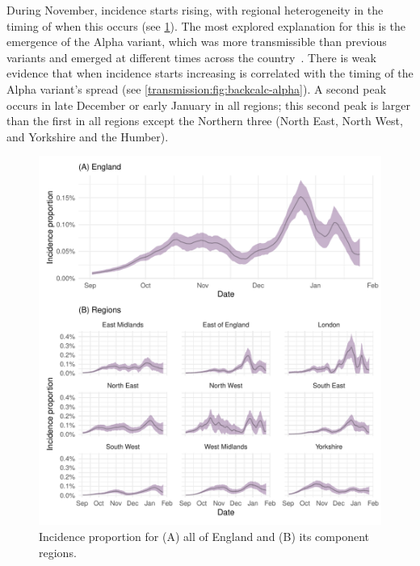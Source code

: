 \documentclass[thesis.tex]{subfiles}
\begin{document}
During November, incidence starts rising, with regional heterogeneity in the timing of when this occurs (see \cref{transmission:fig:backcalc-regions}).
The most explored explanation for this is the emergence of the Alpha variant, which was more transmissible than previous variants and emerged at different times across the country~\autocite{walkerTracking,daviesEstimated,lythgoeLineage}.
There is weak evidence that when incidence starts increasing is correlated with the timing of the Alpha variant's spread (see \cref{transmission:fig:backcalc-alpha}).
A second peak occurs in late December or early January in all regions; this second peak is larger than the first in all regions except the Northern three (North East, North West, and Yorkshire and the Humber).
\begin{figure}
    \includegraphics{transmission/backcalc-regions}
    \caption[Incidence estimated using backcalculation by region]{%
        Incidence proportion for (A) all of England and (B) its component regions.
    }
    \label{transmission:fig:backcalc-regions}
\end{figure}
\end{document}
